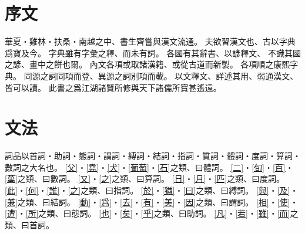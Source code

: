\chapter*{序文}
華夏・雞林・扶桑・南越之中、書生齊嘗與漢文流通。
夫欲習漢文也、古以字典爲寶及今。
字典雖有字彙之釋、而未有詞。
各國有其辭書、以諺釋文、
不識其國之諺、畫中之餅也爾。
內文各項或取諸漢籍、或從古道而新製。
各項順之康熙字典。
同源之詞同項而登、異源之詞別項而載。
以文釋文、詳述其用、弱通漢文、皆可以讀。
此書之爲江湖諸賢所修與天下諸儒所寶甚遙遠。
\chapter*{文法}
詞品以首詞・助詞・態詞・謂詞・縛詞・結詞・指詞・質詞・體詞・度詞・算詞・數詞之大名也。
\cref{父}・\cref{堯}・\cref{犬}・\cref{葡萄}・\cref{石}之類、曰體詞。
\cref{二}・\cref{旬}・\cref{百}・\cref{萬}之類、曰數詞。
\cref{又}・\cref{之}之類、曰算詞。
\cref{日}・\cref{月}・\cref{匹}之類、曰度詞。
\cref{此}・\cref{何}・\cref{誰}・\cref{之}之類、曰指詞。
\cref{於}・\cref{猶}・\cref{曰}之類、曰縛詞。
\cref{與}・\cref{及}・\cref{兼}之類、曰結詞。
\cref{動}・\cref{爲}・\cref{去}・\cref{有}・\cref{美}・\cref{因}之類、曰謂詞。
\cref{相}・\cref{使}・\cref{遭}・\cref{所}之類、曰態詞。
\cref{也}・\cref{矣}・\cref{乎}之類、曰助詞。
\cref{凡}・\cref{若}・\cref{雖}・\cref{而}之類、曰首詞。
